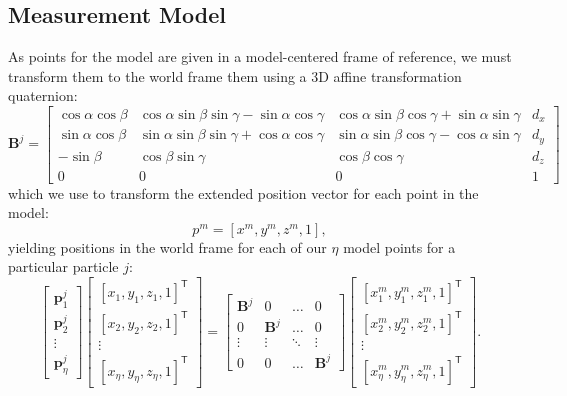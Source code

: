 \subsection{Measurement Model}
As points for the model are given in a model-centered frame of reference, we must transform them to the world frame them using a 3D affine transformation quaternion:
\begin{equation} \mathbf{B}^j = 
\begin{bmatrix}
 \cos{\alpha}\cos{\beta} & \cos{\alpha}\sin{\beta}\sin{\gamma} - \sin{\alpha}\cos{\gamma} & \cos{\alpha}\sin{\beta}\cos{\gamma} + \sin{\alpha}\sin{\gamma}  & d_x \\ 
\sin{\alpha}\cos{\beta} & \sin{\alpha}\sin{\beta}\sin{\gamma} + \cos{\alpha}\cos{\gamma} & \sin{\alpha}\sin{\beta}\cos{\gamma} - \cos{\alpha}\sin{\gamma}  & d_y \\ 
 -\sin{\beta} & \cos{\beta}\sin{\gamma} & \cos{\beta}\cos{\gamma} & d_z \\ 
 0 & 0 & 0 & 1
\end{bmatrix} \end{equation}
 which we use to transform the extended position vector for each point in the model:
\begin{equation} 
  p^m = [x^m,y^m,z^m,1],
\end{equation}
 yielding positions in the world frame for each of our $\eta$ model points for a particular particle $j$:
\begin{equation} 
  \begin{bmatrix}
    \mathbf{p}^j_1 \\
    \mathbf{p}^j_2 \\
    \vdots \\
    \mathbf{p}^j_\eta
  \end{bmatrix}
  \begin{bmatrix}
    [x_1,y_1,z_1,1]^\mathsf{T} \\
    [x_2,y_2,z_2,1]^\mathsf{T} \\
    \vdots    \\
    [x_\eta,y_\eta,z_\eta,1]^\mathsf{T}
  \end{bmatrix}
  =
  \begin{bmatrix} 
    \mathbf{B}^j & 0 & \ldots & 0 \\
    0 & \mathbf{B}^j & \ldots &  0 \\
    \vdots & \vdots & \ddots & \vdots \\
    0 & 0 & \ldots & \mathbf{B}^j 
  \end{bmatrix} 
  \begin{bmatrix}
    [x^m_1,y^m_1,z^m_1,1]^\mathsf{T} \\
    [x^m_2,y^m_2,z^m_2,1]^\mathsf{T} \\
    \vdots    \\
    [x^m_\eta,y^m_\eta,z^m_\eta,1]^\mathsf{T}
  \end{bmatrix}.
\end{equation}

